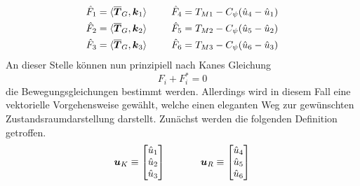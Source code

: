 \begin{align}
\hat{F}_1 &= \langle {\overline{\boldsymbol{T}}_G}, {\boldsymbol{k}_1} \rangle &&\hspace{15pt}\hat{F}_4 = T_{M1} - C_{\psi}(\hat{u}_4 - \hat{u}_1)
\\
\hat{F}_2 &= \langle {\overline{\boldsymbol{T}}_G}, {\boldsymbol{k}_2} \rangle &&\hspace{15pt}\hat{F}_5 = T_{M2} - C_{\psi}(\hat{u}_5 - \hat{u}_2)
\\
\hat{F}_3 &= \langle {\overline{\boldsymbol{T}}_G}, {\boldsymbol{k}_3} \rangle &&\hspace{15pt}\hat{F}_6 = T_{M3} - C_{\psi}(\hat{u}_6 - \hat{u}_3)
\end{align}
An dieser Stelle können nun prinzipiell nach Kanes Gleichung
\begin{equation}
F_i + F^*_i = 0
\end{equation}
die Bewegungsgleichungen bestimmt werden. Allerdings wird in diesem Fall eine vektorielle Vorgehensweise gewählt, welche einen eleganten Weg zur gewünschten Zustandsraumdarstellung darstellt. Zunächst werden die folgenden Definition getroffen.
\begin{equation}
\boldsymbol{u}_K \equiv \begin{bmatrix} \hat{u}_1 \\ \hat{u}_2 \\ \hat{u}_3 \end{bmatrix}
\hspace{35pt}
\boldsymbol{u}_R \equiv \begin{bmatrix} \hat{u}_4 \\ \hat{u}_5 \\ \hat{u}_6 \end{bmatrix}
\end{equation}
